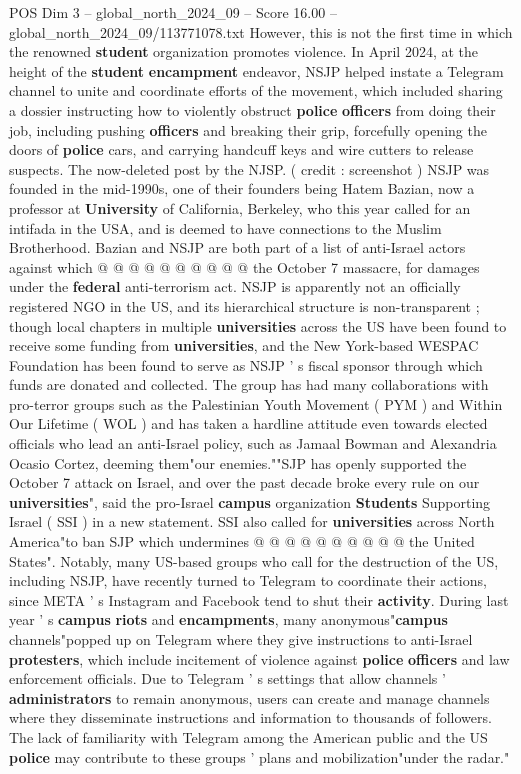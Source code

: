 \begin{textsample}{POS Dim 3 – global\_north\_2024\_09 – Score 16.00 – global\_north\_2024\_09/113771078.txt}
However, this is not the first time in which the renowned \textbf{student} organization promotes violence.
In April 2024, at the height of the \textbf{student} \textbf{encampment} endeavor, NSJP helped instate a Telegram channel to unite and coordinate efforts of the movement, which included sharing a dossier instructing how to violently obstruct \textbf{police} \textbf{officers} from doing their job, including pushing \textbf{officers} and breaking their grip, forcefully opening the doors of \textbf{police} cars, and carrying handcuff keys and wire cutters to release suspects.
The now-deleted post by the NJSP. ( credit : screenshot ) NSJP was founded in the mid-1990s, one of their founders being Hatem Bazian, now a professor at \textbf{University} of California, Berkeley, who this year called for an intifada in the USA, and is deemed to have connections to the Muslim Brotherhood.
Bazian and NSJP are both part of a list of anti-Israel actors against which @ @ @ @ @ @ @ @ @ @ the October 7 massacre, for damages under the \textbf{federal} anti-terrorism act.
NSJP is apparently not an officially registered NGO in the US, and its hierarchical structure is non-transparent ; though local chapters in multiple \textbf{universities} across the US have been found to receive some funding from \textbf{universities}, and the New York-based WESPAC Foundation has been found to serve as NSJP ' s fiscal sponsor through which funds are donated and collected.
The group has had many collaborations with pro-terror groups such as the Palestinian Youth Movement ( PYM ) and Within Our Lifetime ( WOL ) and has taken a hardline attitude even towards elected officials who lead an anti-Israel policy, such as Jamaal Bowman and Alexandria Ocasio Cortez, deeming them"our enemies.""SJP has openly supported the October 7 attack on Israel, and over the past decade broke every rule on our \textbf{universities}", said the pro-Israel \textbf{campus} organization \textbf{Students} Supporting Israel ( SSI ) in a new statement.
SSI also called for \textbf{universities} across North America"to ban SJP which undermines @ @ @ @ @ @ @ @ @ @ the United States".
Notably, many US-based groups who call for the destruction of the US, including NSJP, have recently turned to Telegram to coordinate their actions, since META ' s Instagram and Facebook tend to shut their \textbf{activity}.
During last year ' s \textbf{campus} \textbf{riots} and \textbf{encampments}, many anonymous"\textbf{campus} channels"popped up on Telegram where they give instructions to anti-Israel \textbf{protesters}, which include incitement of violence against \textbf{police} \textbf{officers} and law enforcement officials.
Due to Telegram ' s settings that allow channels ' \textbf{administrators} to remain anonymous, users can create and manage channels where they disseminate instructions and information to thousands of followers.
The lack of familiarity with Telegram among the American public and the US \textbf{police} may contribute to these groups ' plans and mobilization"under the radar."

\end{textsample}
